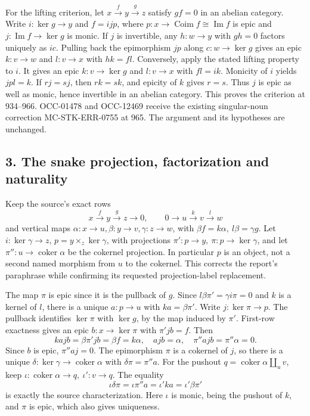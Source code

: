 \documentclass[11pt]{article}
\begin{document}
For the lifting criterion, let \(x\xrightarrow f y\xrightarrow g z\) satisfy \(gf=0\) in an abelian category. Write \(i:\ker g\to y\) and \(f=i j p\), where \(p:x\to\operatorname{Coim}f\cong\operatorname{Im}f\) is epic and \(j:\operatorname{Im}f\to\ker g\) is monic. If \(j\) is invertible, any \(h:w\to y\) with \(gh=0\) factors uniquely as \(ic\). Pulling back the epimorphism \(jp\) along \(c:w\to\ker g\) gives an epic \(k:v\to w\) and \(l:v\to x\) with \(hk=fl\). Conversely, apply the stated lifting property to \(i\). It gives an epic \(k:v\to\ker g\) and \(l:v\to x\) with \(fl=ik\). Monicity of \(i\) yields \(jpl=k\). If \(rj=sj\), then \(rk=sk\), and epicity of \(k\) gives \(r=s\). Thus \(j\) is epic as well as monic, hence invertible in an abelian category. This proves the criterion at 934--966. OCC-01478 and OCC-12469 receive the existing singular-noun correction MC-STK-ERR-0755 at 965. The argument and its hypotheses are unchanged.

\subsection{3. The snake projection, factorization and naturality}\label{note-01-the-snake-projection-factorization-and-naturality}

Keep the source's exact rows \[
x\xrightarrow f y\xrightarrow g z\to0,\qquad
0\to u\xrightarrow k v\xrightarrow l w
\] and vertical maps \(\alpha:x\to u,\beta:y\to v,\gamma:z\to w\), with \(\beta f=k\alpha,\ l\beta=\gamma g\). Let \(i:\ker\gamma\to z\), \(p=y\times_z\ker\gamma\), with projections \(\pi':p\to y,\ \pi:p\to\ker\gamma\), and let \(\pi'':u\to\operatorname{coker}\alpha\) be the cokernel projection. In particular \(p\) is an object, not a second named morphism from \(u\) to the cokernel. This corrects the report's paraphrase while confirming its requested projection-label replacement.

The map \(\pi\) is epic since it is the pullback of \(g\). Since \(l\beta\pi'=\gamma i\pi=0\) and \(k\) is a kernel of \(l\), there is a unique \(a:p\to u\) with \(ka=\beta\pi'\). Write \(j:\ker\pi\to p\). The pullback identifies \(\ker\pi\) with \(\ker g\), by the map induced by \(\pi'\). First-row exactness gives an epic \(b:x\to\ker\pi\) with \(\pi'jb=f\). Then \[
kajb=\beta\pi'jb=\beta f=k\alpha,\quad
ajb=\alpha,\quad \pi''ajb=\pi''\alpha=0.
\] Since \(b\) is epic, \(\pi''aj=0\). The epimorphism \(\pi\) is a cokernel of \(j\), so there is a unique \(\delta:\ker\gamma\to\operatorname{coker}\alpha\) with \(\delta\pi=\pi''a\). For the pushout \(q=\operatorname{coker}\alpha\amalg_u v\), keep \(\iota:\operatorname{coker}\alpha\to q,\ \iota':v\to q\). The equality \[
\iota\delta\pi=\iota\pi''a=\iota'ka=\iota'\beta\pi'
\] is exactly the source characterization. Here \(\iota\) is monic, being the pushout of \(k\), and \(\pi\) is epic, which also gives uniqueness.
\end{document}

